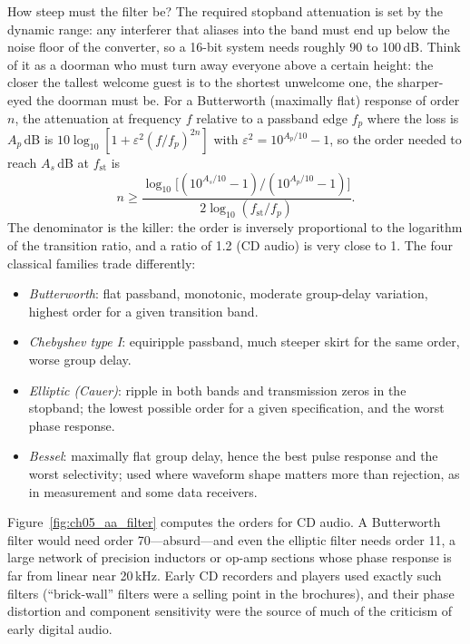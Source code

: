 How steep must the filter be? The required stopband attenuation is set by the dynamic range:
any interferer that aliases into the band must end up below the noise floor of the
converter, so a 16-bit system needs roughly 90 to 100\,dB. Think of it as a doorman who must turn
away everyone above a certain height: the closer the tallest welcome guest is to the shortest
unwelcome one, the sharper-eyed the doorman must be. For a Butterworth (maximally flat)
response of order $n$, the attenuation at frequency $f$ relative to a passband edge $f_p$
where the loss is $A_p$\,dB is $10\log_{10}[1+\varepsilon^2(f/f_p)^{2n}]$ with
$\varepsilon^2=10^{A_p/10}-1$, so the order needed to reach $A_s$\,dB at $f_{\text{st}}$ is
\begin{equation}
n\ge\frac{\log_{10}\big[(10^{A_s/10}-1)/(10^{A_p/10}-1)\big]}{2\log_{10}(f_{\text{st}}/f_p)}.
\label{eq:ch05:buttord}
\end{equation}
The denominator is the killer: the order is inversely proportional to the logarithm of the
transition ratio, and a ratio of 1.2 (CD audio) is very close to 1. The four classical
families trade differently:
\begin{itemize}
\item \emph{Butterworth}: flat passband, monotonic, moderate group-delay variation, highest
order for a given transition band.
\item \emph{Chebyshev type I}: equiripple passband, much steeper skirt for the same order,
worse group delay.
\item \emph{Elliptic (Cauer)}: ripple in both bands and transmission zeros in the stopband;
the lowest possible order for a given specification, and the worst phase response.
\item \emph{Bessel}: maximally flat group delay, hence the best pulse response and the worst
selectivity; used where waveform shape matters more than rejection, as in measurement and
some data receivers.
\end{itemize}


Figure~\ref{fig:ch05_aa_filter} computes the orders for CD audio. A Butterworth filter would
need order 70---absurd---and even the elliptic filter needs order 11, a large network of
precision inductors or op-amp sections whose phase response is far from linear near
20\,kHz. Early CD recorders and players used exactly such filters (``brick-wall'' filters
were a selling point in the brochures), and their phase distortion and component sensitivity
were the source of much of the criticism of early digital audio.

